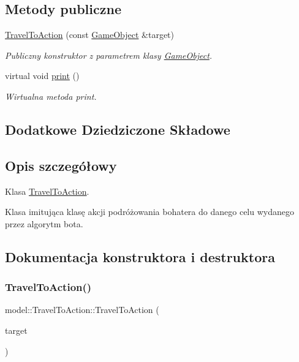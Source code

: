 \subsection*{Metody publiczne}
\begin{DoxyCompactItemize}
\item 
\hyperlink{classmodel_1_1TravelToAction_a5ed67f056ded96df84548a9b9e578a90}{Travel\+To\+Action} (const \hyperlink{classmodel_1_1GameObject}{Game\+Object} \&target)
\begin{DoxyCompactList}\small\item\em Publiczny konstruktor z parametrem klasy \hyperlink{classmodel_1_1GameObject}{Game\+Object}. \end{DoxyCompactList}\item 
virtual void \hyperlink{classmodel_1_1TravelToAction_accc5a7f3bf4d65e22d5d7d86624a8da1}{print} ()
\begin{DoxyCompactList}\small\item\em Wirtualna metoda print. \end{DoxyCompactList}\end{DoxyCompactItemize}
\subsection*{Dodatkowe Dziedziczone Składowe}


\subsection{Opis szczegółowy}
Klasa \hyperlink{classmodel_1_1TravelToAction}{Travel\+To\+Action}. 

Klasa imitująca klasę akcji podróżowania bohatera do danego celu wydanego przez algorytm bota. 

\subsection{Dokumentacja konstruktora i destruktora}
\mbox{\label{classmodel_1_1TravelToAction_a5ed67f056ded96df84548a9b9e578a90}} 
\subsubsection{\texorpdfstring{Travel\+To\+Action()}{TravelToAction()}}
{\footnotesize\ttfamily model\+::\+Travel\+To\+Action\+::\+Travel\+To\+Action (\begin{DoxyParamCaption}\item[{const \hyperlink{classmodel_1_1GameObject}{Game\+Object} \&}]{target }\end{DoxyParamCaption})\hspace{0.3cm}{\ttfamily [inline]}}



